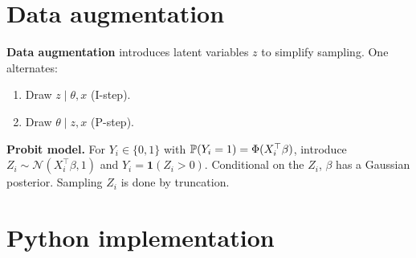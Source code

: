 \section{Data augmentation}

\begin{definition}
\textbf{Data augmentation} introduces latent variables $z$ to
simplify sampling. One alternates:
\begin{enumerate}
  \item Draw $z \mid \theta, x$ (I-step).
  \item Draw $\theta \mid z, x$ (P-step).
\end{enumerate}
\end{definition}

\begin{example}
\textbf{Probit model.} For $Y_i \in \{0, 1\}$ with
$\mathbb{P}(Y_i = 1) = \Phi(X_i^\top \beta)$, introduce
$Z_i \sim \mathcal{N}(X_i^\top \beta, 1)$ and
$Y_i = \mathbf{1}(Z_i > 0)$. Conditional on the $Z_i$, $\beta$ has a
Gaussian posterior. Sampling $Z_i$ is done by truncation.
\end{example}

\section{Python implementation}

